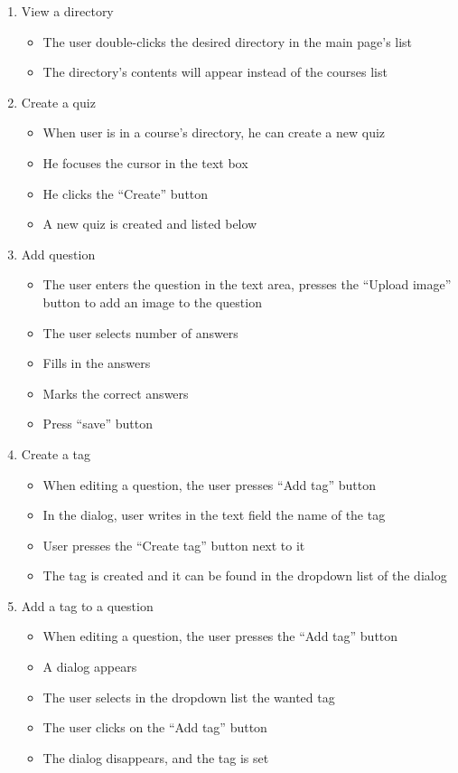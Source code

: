 \begin{enumerate}
  \item View a directory
  \begin{itemize}
    \item The user double-clicks the desired directory in the main page’s list
    \item The directory’s contents will appear instead of the courses list
  \end{itemize}  

  \item Create a quiz
  \begin{itemize}
    \item When user is in a course's directory, he can create a new quiz
    \item He focuses the cursor in the text box
    \item He clicks the ``Create'' button
    \item A new quiz is created and listed below
  \end{itemize}

  \item Add question
  \begin{itemize}
    \item The user enters the question in the text area, presses the “Upload image” button to add an image to the question
    \item The user selects number of answers
    \item Fills in the answers
    \item Marks the correct answers
    \item Press “save” button
  \end{itemize}

  \item Create a tag
  \begin{itemize}
    \item When editing a question, the user presses “Add tag” button
    \item In the dialog, user writes in the text field the name of the tag
    \item User presses the “Create tag” button next to it
    \item The tag is created and it can be found in the dropdown list of the dialog
  \end{itemize}

  \item Add a tag to a question
  \begin{itemize}
    \item When editing a question, the user presses the “Add tag” button
    \item A dialog appears
    \item The user selects in the dropdown list the wanted tag
    \item The user clicks on the “Add tag” button
    \item The dialog disappears, and the tag is set
  \end{itemize}    


\end{enumerate}
